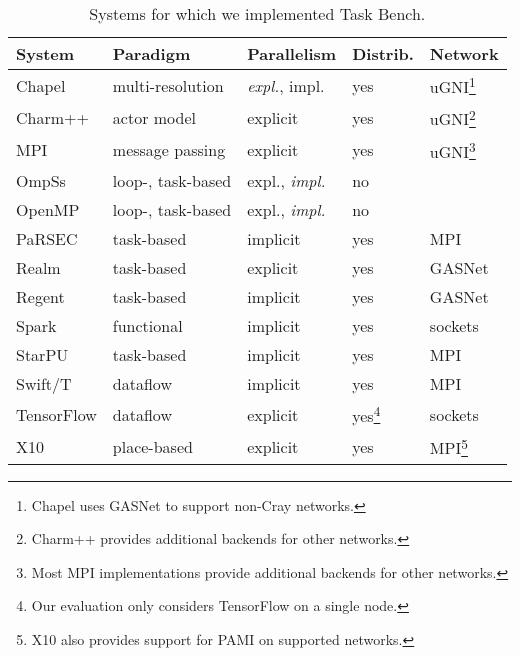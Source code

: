 \begin{table}[t]
\begin{tabular}{l | l | l | l | l}
System & Paradigm & Parallelism & Distrib. & Network \\
\hline
Chapel & multi-resolution & \emph{expl.}, impl. & yes & uGNI\footnote{Chapel uses GASNet to support non-Cray networks.} \\
Charm++ & actor model & explicit & yes & uGNI\footnote{Charm++ provides additional backends for other networks.} \\
MPI & message passing & explicit & yes & uGNI\footnote{Most MPI implementations provide additional backends for other networks.} \\
OmpSs & loop-, task-based & expl., \emph{impl.} & no & \\
OpenMP & loop-, task-based & expl., \emph{impl.} & no & \\
PaRSEC & task-based & implicit & yes & MPI \\
Realm & task-based & explicit & yes & GASNet \\
Regent & task-based & implicit & yes & GASNet \\
Spark & functional & implicit & yes & sockets \\
StarPU & task-based & implicit & yes & MPI \\
Swift/T & dataflow & implicit & yes & MPI \\
TensorFlow & dataflow & explicit & yes\footnote{Our evaluation only considers TensorFlow on a single node.} & sockets \\
X10 & place-based & explicit & yes & MPI\footnote{X10 also provides support for PAMI on supported networks.}
\end{tabular}

\caption{Systems for which we implemented Task Bench.\label{tab:systems}}
\vspace{-0.5cm}
\end{table}
